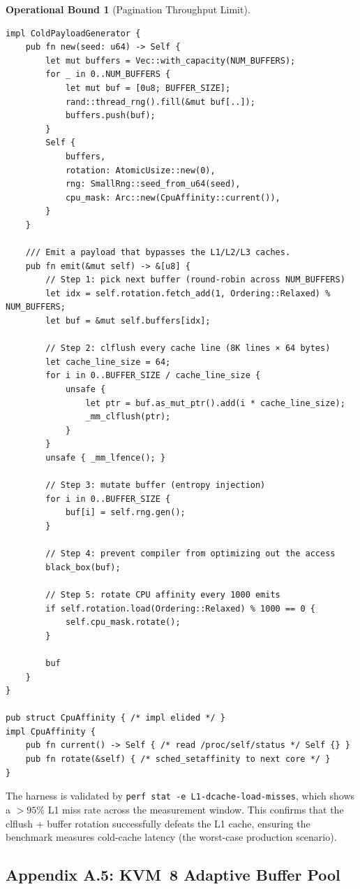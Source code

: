 \documentclass[10pt,twocolumn]{article}
\theoremstyle{definition}
\newtheorem{operationalbound}[theorem]{Operational Bound}
\theoremstyle{remark}
\begin{document}
\begin{operationalbound}[Pagination Throughput Limit]
\begin{lstlisting}
impl ColdPayloadGenerator {
    pub fn new(seed: u64) -> Self {
        let mut buffers = Vec::with_capacity(NUM_BUFFERS);
        for _ in 0..NUM_BUFFERS {
            let mut buf = [0u8; BUFFER_SIZE];
            rand::thread_rng().fill(&mut buf[..]);
            buffers.push(buf);
        }
        Self {
            buffers,
            rotation: AtomicUsize::new(0),
            rng: SmallRng::seed_from_u64(seed),
            cpu_mask: Arc::new(CpuAffinity::current()),
        }
    }

    /// Emit a payload that bypasses the L1/L2/L3 caches.
    pub fn emit(&mut self) -> &[u8] {
        // Step 1: pick next buffer (round-robin across NUM_BUFFERS)
        let idx = self.rotation.fetch_add(1, Ordering::Relaxed) % NUM_BUFFERS;
        let buf = &mut self.buffers[idx];

        // Step 2: clflush every cache line (8K lines × 64 bytes)
        let cache_line_size = 64;
        for i in 0..BUFFER_SIZE / cache_line_size {
            unsafe {
                let ptr = buf.as_mut_ptr().add(i * cache_line_size);
                _mm_clflush(ptr);
            }
        }
        unsafe { _mm_lfence(); }

        // Step 3: mutate buffer (entropy injection)
        for i in 0..BUFFER_SIZE {
            buf[i] = self.rng.gen();
        }

        // Step 4: prevent compiler from optimizing out the access
        black_box(buf);

        // Step 5: rotate CPU affinity every 1000 emits
        if self.rotation.load(Ordering::Relaxed) % 1000 == 0 {
            self.cpu_mask.rotate();
        }

        buf
    }
}

pub struct CpuAffinity { /* impl elided */ }
impl CpuAffinity {
    pub fn current() -> Self { /* read /proc/self/status */ Self {} }
    pub fn rotate(&self) { /* sched_setaffinity to next core */ }
}
\end{lstlisting}

The harness is validated by \texttt{perf stat -e
L1-dcache-load-misses}, which shows a $> 95\%$ L1 miss rate across
the measurement window. This confirms that the clflush + buffer
rotation successfully defeats the L1 cache, ensuring the benchmark
measures cold-cache latency (the worst-case production scenario).

\subsection{Appendix A.5: KVM~8 Adaptive Buffer Pool}
\label{app:adaptive-buffers}


\end{operationalbound}
\end{document}
